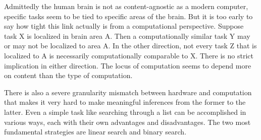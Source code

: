 Admittedly the human brain is not as content-agnostic as a modern computer, specific tasks seem to be tied to specific areas of the brain.
But it is too early to say how tight this link actually is from a computational perspective.
Suppose task X is localized in brain area A\@.
Then a computationally similar task Y may or may not be localized to area A\@.
In the other direction, not every task Z that is localized to A is necessarily computationally comparable to X\@.
There is no strict implication in either direction.
The locus of computation seems to depend more on content than the type of computation.

There is also a severe granularity mismatch between hardware and computation that makes it very hard to make meaningful inferences from the former to the latter.
Even a simple task like searching through a list can be accomplished in various ways, each with their own advantages and disadvantages.
The two most fundamental strategies are linear search and binary search.
%
